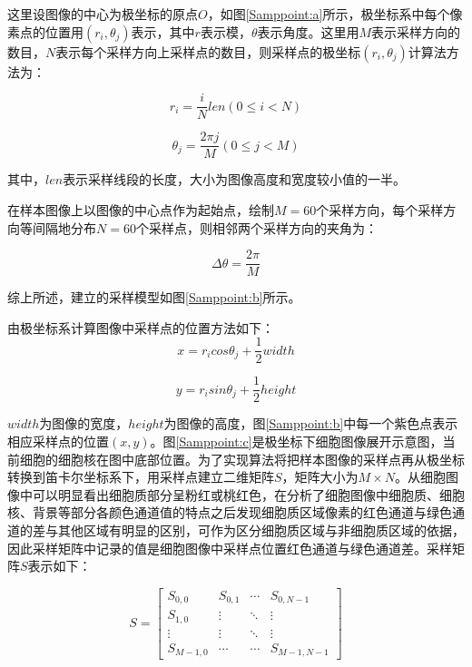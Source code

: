 \documentclass[nomlist,masters]{seuthesix}
\begin{document}
这里设图像的中心为极坐标的原点$O$，如图\ref{Samppoint:a}所示，极坐标系中每个像素点的位置用$(r_{i},\theta_{j} )$表示，其中$r$表示模，$\theta$表示角度。这里用$M$表示采样方向的数目，$N$表示每个采样方向上采样点的数目，则采样点的极坐标$(r_{i},\theta_{j} )$计算法方法为：

\begin{equation}
r_{i}=\frac{i}{N}len\left ( 0\leqslant i < N \right )
\label{r}
\end{equation}

\begin{equation}
\theta _{j}=\frac{2\pi j}{M} \left ( 0\leqslant j< M \right )
\label{theta}
\end{equation}

其中，$len$表示采样线段的长度，大小为图像高度和宽度较小值的一半。


在样本图像上以图像的中心点作为起始点，绘制$M=60$个采样方向，每个采样方向等间隔地分布$N=60$个采样点，则相邻两个采样方向的夹角为：

\begin{equation}
\Delta \theta=\frac{2\pi}{M} 
\label{_theta}
\end{equation}

综上所述，建立的采样模型如图\ref{Samppoint:b}所示。

由极坐标系计算图像中采样点的位置方法如下：
\begin{equation}
x=r_{i}cos\theta _{j}+\frac{1}{2}width
\label{x}
\end{equation}

\begin{equation}
y=r_{i}sin\theta _{j}+\frac{1}{2}height
\label{y}
\end{equation}

$width$为图像的宽度，$height$为图像的高度，图\ref{Samppoint:b}中每一个紫色点表示相应采样点的位置$(x,y)$。图\ref{Samppoint:c}是极坐标下细胞图像展开示意图，当前细胞的细胞核在图中底部位置。为了实现算法将把样本图像的采样点再从极坐标转换到笛卡尔坐标系下，用采样点建立二维矩阵$S$，矩阵大小为$M\times N$。从细胞图像中可以明显看出细胞质部分呈粉红或桃红色，在分析了细胞图像中细胞质、细胞核、背景等部分各颜色通道值的特点之后发现细胞质区域像素的红色通道与绿色通道的差与其他区域有明显的区别，可作为区分细胞质区域与非细胞质区域的依据，因此采样矩阵中记录的值是细胞图像中采样点位置红色通道与绿色通道差。采样矩阵$S$表示如下：

\begin{equation}
S=\begin{bmatrix}
S_{0,0} & S_{0,1} &  \cdots & S_{0,N-1}\\ 
S_{1,0} &  \vdots &  \ddots & \vdots\\ 
 \vdots &  \vdots &  \ddots & \vdots \\ 
S_{M-1,0} &  \cdots &  \cdots & S_{M-1,N-1}
\end{bmatrix}
\label{S}
\end{equation}
\end{document}
